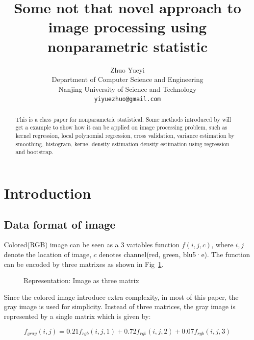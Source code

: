 \documentclass{article}
\title{Some not that novel approach to image processing using nonparametric statistic}
\author{
  Zhuo Yueyi \\ %
  Department of Computer Science and Engineering\\
  Nanjing University of Science and Technology\\
  \texttt{yiyuezhuo@gmail.com} \\
}
\begin{document}
\tableofcontents
\newpage

\maketitle

\begin{abstract}
This is a class paper for nonparametric statistical. 
Some methods introduced by \cite{wasserman2006all} will get a example to show how it can be applied on
image processing problem, such as kernel regression, local polynomial regression, cross validation, variance estimation
by smoothing, histogram, kernel density estimation density estimation using regression and bootstrap.
\end{abstract}




\section{Introduction}




\subsection{Data format of image}

Colored(RGB) image can be seen as a 3 variables function  $f(i,j,c)$, where $i,j$ denote the location of image, $c$ denotes
channel(red, green, blu5·e). The function can be encoded by three matrixes as shown in Fig~\ref{fig:toad_rgb}.

\begin{figure}[htb]
  \centering
  
  \caption{Representation: Image as three matrix}
  \label{fig:toad_rgb}
\end{figure}

Since the colored image introduce extra complexity, in most of this paper, the gray image is used for simplicity.
Instead of three matrices, the gray image is represented by a single matrix which is given by:

\begin{equation}
  f_{gray}(i,j) = 0.21 f_{rgb}(i,j,1) + 0.72 f_{rgb}(i,j,2) + 0.07 f_{rgb}(i,j,3)
  \label{eq:rgb_to_gray}
\end{equation}
\end{document}
